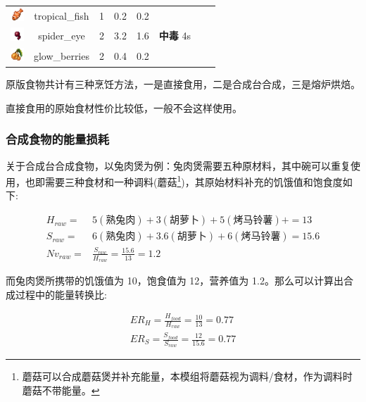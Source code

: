 \begin{center}
\begin{longtable}{c|c|ccc|ccc}
        \includegraphics[width=0.5cm,height=0.5cm]{./images/origin/tropical_fish.png}  & tropical\_fish & 1 & 0.2 & 0.2 \\ 
        \includegraphics[width=0.5cm,height=0.5cm]{./images/origin/spider_eye.png}  & spider\_eye & 2 & 3.2 & 1.6 & \textbf{中毒} 4s \\ 
        \includegraphics[width=0.5cm,height=0.5cm]{./images/origin/glow_berries.png}  & glow\_berries & 2 & 0.4 & 0.2 \\
        \bottomrule
    \end{longtable}
\end{center}

原版食物共计有三种烹饪方法，一是直接食用，二是合成台合成，三是熔炉烘焙。

直接食用的原始食材性价比较低，一般不会这样使用。

\subsubsection{合成食物的能量损耗}

关于合成台合成食物，以兔肉煲为例：兔肉煲需要五种原材料，其中碗可以重复使用，也即需要三种食材和一种调料(蘑菇\footnote{蘑菇可以合成蘑菇煲并补充能量，本模组将蘑菇视为调料/食材，作为调料时蘑菇不带能量。})，其原始材料补充的饥饿值和饱食度如下:

\begin{equation}
    \begin{aligned}
        H_{raw} = & 5(\text{熟兔肉}) + 3(\text{胡萝卜}) + 5(\text{烤马铃薯}) + = 13 \\
        S_{raw} = & 6(\text{熟兔肉}) + 3.6(\text{胡萝卜}) + 6(\text{烤马铃薯}) = 15.6 \\
        Nv_{raw} = & \frac{S_{raw}}{H_{raw}} = \frac{15.6}{13} = 1.2 \nonumber
    \end{aligned}
\end{equation}

而兔肉煲所携带的饥饿值为 10，饱食值为 12，营养值为 1.2。那么可以计算出合成过程中的能量转换比:

\begin{equation}
    \begin{aligned}
        ER_{H} = \frac{H_{food}}{H_{raw}} = \frac{10}{13} = 0.77 \\
        ER_{S} = \frac{S_{food}}{S_{raw}} = \frac{12}{15.6} = 0.77 \nonumber
    \end{aligned}
\end{equation}

